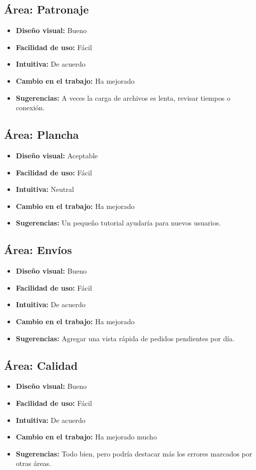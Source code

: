\documentclass[12pt,letterpaper,spanish]{report}
\begin{document}
\subsection*{Área: Patronaje}
\begin{itemize}
    \item \textbf{Diseño visual:} Bueno
    \item \textbf{Facilidad de uso:} Fácil
    \item \textbf{Intuitiva:} De acuerdo
    \item \textbf{Cambio en el trabajo:} Ha mejorado
    \item \textbf{Sugerencias:} A veces la carga de archivos es lenta, revisar tiempos o conexión.
\end{itemize}

\subsection*{Área: Plancha}
\begin{itemize}
    \item \textbf{Diseño visual:} Aceptable
    \item \textbf{Facilidad de uso:} Fácil
    \item \textbf{Intuitiva:} Neutral
    \item \textbf{Cambio en el trabajo:} Ha mejorado
    \item \textbf{Sugerencias:} Un pequeño tutorial ayudaría para nuevos usuarios.
\end{itemize}

\subsection*{Área: Envíos}
\begin{itemize}
    \item \textbf{Diseño visual:} Bueno
    \item \textbf{Facilidad de uso:} Fácil
    \item \textbf{Intuitiva:} De acuerdo
    \item \textbf{Cambio en el trabajo:} Ha mejorado
    \item \textbf{Sugerencias:} Agregar una vista rápida de pedidos pendientes por día.
\end{itemize}

\subsection*{Área: Calidad}
\begin{itemize}
    \item \textbf{Diseño visual:} Bueno
    \item \textbf{Facilidad de uso:} Fácil
    \item \textbf{Intuitiva:} De acuerdo
    \item \textbf{Cambio en el trabajo:} Ha mejorado mucho
    \item \textbf{Sugerencias:} Todo bien, pero podría destacar más los errores marcados por otras áreas.
\end{itemize}
\end{document}
